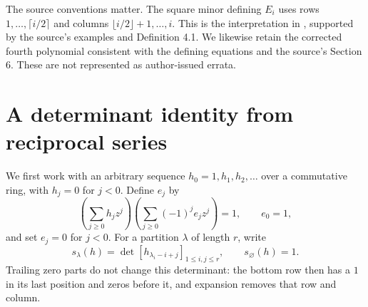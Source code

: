 \documentclass[11pt]{article}
\theoremstyle{definition}
\theoremstyle{remark}
\begin{document}
The source conventions matter. The square minor defining $E_i$ uses rows
$1,\ldots,\lceil i/2\rceil$ and columns $\lfloor i/2\rfloor+1,\ldots,i$.
This is the interpretation in \cite{Polynomiality}, supported by
the source's examples and Definition 4.1. We likewise retain the corrected
fourth polynomial consistent with the defining equations and the source's
Section 6. These are not represented as author-issued errata.

\section{A determinant identity from reciprocal series}
We first work with an arbitrary sequence $h_0=1,h_1,h_2,\ldots$ over a
commutative ring, with $h_j=0$ for $j<0$. Define $e_j$ by
\[
 \left(\sum_{j\ge0}h_jz^j\right)
 \left(\sum_{j\ge0}(-1)^je_jz^j\right)=1,
 \qquad e_0=1,
\]
and set $e_j=0$ for $j<0$.
For a partition $\lambda$ of length $r$, write
\[
 s_\lambda(h)=\det[h_{\lambda_i-i+j}]_{1\le i,j\le r},
 \qquad s_\varnothing(h)=1.
\]
Trailing zero parts do not change this determinant: the bottom row then
has a $1$ in its last position and zeros before it, and expansion removes
that row and column.
\end{document}
